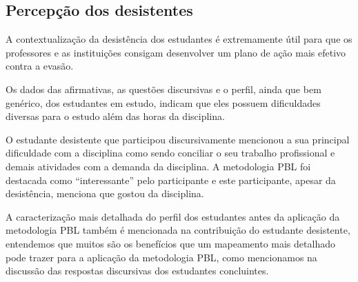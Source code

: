 \subsection{Percepção dos desistentes}

A contextualização da desistência dos estudantes é extremamente útil
para que os professores e as instituições consigam desenvolver um
plano de ação mais efetivo contra a evasão.

Os dados das afirmativas, as questões discursivas e o perfil,
ainda que bem genérico, dos estudantes em estudo, indicam que
eles possuem dificuldades diversas para o estudo além
das horas da disciplina.

O estudante desistente que participou discursivamente mencionou a sua
principal dificuldade com a disciplina como sendo conciliar o
seu trabalho profissional e demais atividades com
a demanda da disciplina.
A metodologia PBL foi destacada como ``interessante''
pelo participante e este participante, apesar da desistência,
menciona que gostou da disciplina.

A caracterização mais detalhada do perfil dos estudantes
antes da aplicação da metodologia PBL também é mencionada
na contribuição do estudante desistente, entendemos
que muitos são os benefícios que um mapeamento mais detalhado
pode trazer para a aplicação da metodologia PBL, como
mencionamos na discussão das respostas discursivas dos estudantes
concluintes.
